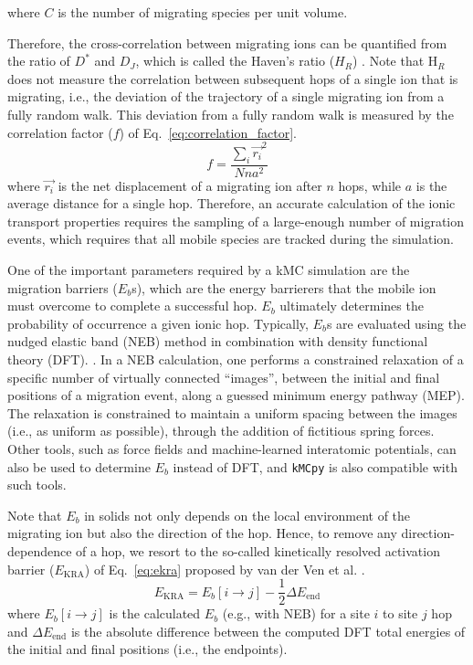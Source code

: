 \documentclass[a4paper,fleqn]{cas-dc}
\begin{document}
{where $C$ is the number of migrating species per unit volume.

Therefore, the cross-correlation between migrating ions  can be quantified from the ratio of $D^{*}$ and $D_{J}$, which is called the Haven's ratio ($H_R$) \cite{murch_haven_1982}. Note that H$_R$ does not measure the correlation between subsequent hops of a single ion that is migrating, i.e., the deviation of the trajectory of a single migrating ion from a fully random walk. This deviation from a fully random walk is measured by the correlation factor ($f$) of Eq.~\ref{eq:correlation_factor}.
%
\begin{equation}
    \label{eq:correlation_factor}
    f = \frac{\sum_i \vec{r_i}^2}{Nna^2}
\end{equation}
%
where $\vec{r_i}$ is the net displacement of a migrating ion after $n$ hops, while $a$ is the average distance for a single hop. Therefore, an accurate calculation of the ionic transport properties requires the sampling of a large-enough number of migration events, which requires  that all mobile species are tracked during the simulation.

One of the important parameters required by a kMC simulation are the migration barriers ($E_{b}$s), which are the energy barrierers that the mobile ion must  overcome to complete a successful hop. $E_b$ ultimately determines the probability of occurrence a given ionic hop. Typically, $E_b$s are evaluated using the nudged elastic band (NEB) method in combination with density functional theory (DFT). \cite{jonsson_nudged_1998,henkelman_climbing_2000}. In a NEB calculation, one performs a constrained relaxation  of a specific number of virtually connected ``images'', between the initial and final positions of a migration event, along a guessed minimum energy pathway (MEP). The relaxation is constrained to maintain a uniform spacing between the images (i.e., as uniform as possible), through the addition of fictitious spring forces. Other tools, such as force fields and machine-learned interatomic potentials, can also be used to determine $E_b$ instead of DFT, and \texttt{kMCpy} is also compatible with such tools.

Note that $E_b$ in solids not only depends on the local environment of the migrating ion but also the  direction of the hop. Hence, to remove any direction-dependence of a hop, we resort to the so-called kinetically resolved activation barrier ($E_\mathrm{KRA}$) of Eq.~\ref{eq:ekra} proposed by van der Ven et al. \cite{van_der_ven_first-principles_2001}.
%
\begin{equation}
    \label{eq:ekra}
    E_\mathrm{KRA} = E_{b} [i \rightarrow j] -\frac{1}{2} \Delta E_\mathrm{end}
\end{equation}
%
where $E_{b} [i \rightarrow j]$ is the calculated $E_b$ (e.g., with NEB) for a site $i$ to site $j$ hop and $\Delta E_{\mathrm{end}}$ is the absolute difference between the computed DFT total energies of the initial and final positions (i.e., the endpoints). 

}
\end{document}
